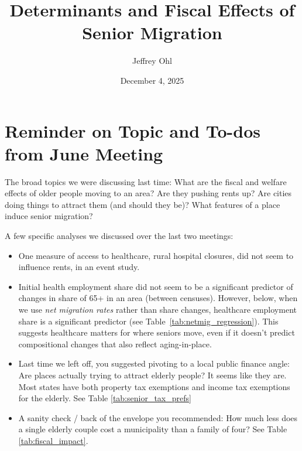 \documentclass[11pt]{article}
\title{Determinants and Fiscal Effects of Senior Migration}
\author{Jeffrey Ohl}
\date{December 4, 2025}
\begin{document}
\maketitle
\section{Reminder on Topic and To-dos from June Meeting}

The broad topics we were discussing last time: What are the fiscal and welfare effects of older people moving to an area? Are they pushing rents up? Are cities doing things to attract them (and should they be)? What features of a place induce senior migration? 


A few specific analyses we discussed over the last two meetings: 
\begin{itemize}
\item One measure of access to healthcare, rural hospital closures, did not seem to influence rents, in an event study.
\item Initial health employment share did not seem to be a significant predictor of changes in share of 65+ in an area (between censuses). However, below, when we use \textit{net migration rates} rather than share changes, healthcare employment share is a significant predictor (see Table~\ref{tab:netmig_regression}). This suggests healthcare matters for where seniors move, even if it doesn't predict compositional changes that also reflect aging-in-place.  
\item Last time we left off, you suggested pivoting to a local public finance angle:  Are places actually trying to attract elderly people? It seems like they are. Most states have both property tax exemptions and income tax exemptions for the elderly.  See Table \ref{tab:senior_tax_prefs}
\item A sanity check / back of the envelope you recommended: How much less does a single elderly couple cost a municipality than a family of four? See Table \ref{tab:fiscal_impact}.
\end{itemize}
\end{document}
